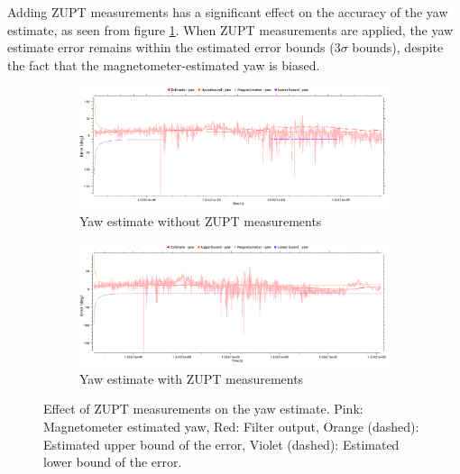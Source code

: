 Adding \gls{ZUPT} measurements has a significant effect on the accuracy of the yaw estimate, as seen from figure \ref{fig:pa:zuptYaw}. When \gls{ZUPT} measurements are applied, the yaw estimate error remains within the estimated error bounds (3$\sigma$ bounds), despite the fact that the magnetometer-estimated yaw is biased.
\begin{figure}[htp]
	\centering
    \begin{subfigure}{\textwidth}
        \includegraphics[width=\textwidth]{figs/yaw-without-zupt.png}
        \caption{Yaw estimate without ZUPT measurements}
    \end{subfigure}
    \begin{subfigure}{\textwidth}
        \includegraphics[width=\textwidth]{figs/yaw-with-zupt.png}
        \caption{Yaw estimate with ZUPT measurements}
    \end{subfigure}
    \vspace{-0.5cm}
    \caption[Effect of ZUPT measurements on the yaw estimate]{Effect of ZUPT measurements on the yaw estimate. Pink: Magnetometer estimated yaw, Red: Filter output, Orange (dashed): Estimated upper bound of the error, Violet (dashed): Estimated lower bound of the error.}
    \label{fig:pa:zuptYaw}
    \vspace{0.5cm}
\end{figure}










